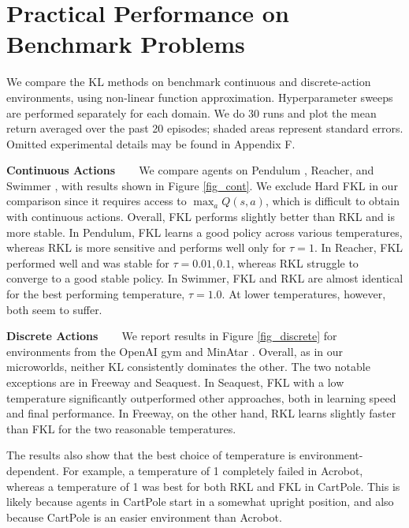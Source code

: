 \documentclass[twoside,11pt]{article}
\newcommand{\myparagraph}[1]{\textbf{#1} \ \ \ }
\begin{document}
\section{Practical Performance on Benchmark Problems}
We compare the KL methods on benchmark continuous and discrete-action environments, using non-linear function approximation. Hyperparameter sweeps are performed separately for each domain. We do 30 runs and plot the mean return averaged over the past 20 episodes; shaded areas represent standard errors. Omitted experimental details may be found in Appendix F. 

\myparagraph{Continuous Actions}
We compare agents on Pendulum \citep{brockman2016openai}, Reacher, and Swimmer \citep{todorov2012mujoco}, with results shown in Figure \ref{fig_cont}. We exclude Hard FKL in our comparison since it requires access to $\max_a Q(s,a)$, which is difficult to obtain with continuous actions. Overall, FKL performs slightly better than RKL and is more stable.
In Pendulum, FKL learns a good policy across various temperatures, whereas RKL is more sensitive and performs well only for $\tau = 1$. 
In Reacher, FKL performed well and was stable for $\tau=0.01, 0.1$, whereas RKL struggle to converge to a good stable policy. 
In Swimmer, FKL and RKL are almost identical for the best performing temperature, $\tau=1.0$. At lower temperatures, however, both seem to suffer.

\myparagraph{Discrete Actions}
We report results in Figure \ref{fig_discrete} for environments from the OpenAI gym \citep{brockman2016openai} and MinAtar \citep{young2019minatar}. Overall, as in our microworlds, neither KL consistently dominates the other. The two notable exceptions are in Freeway and Seaquest. In Seaquest, FKL with a low temperature significantly outperformed other approaches, both in learning speed and final performance. In Freeway, on the other hand, RKL learns slightly faster than FKL for the two reasonable temperatures.  

The results also show that the best choice of temperature is environment-dependent. For example, a temperature of 1 completely failed in Acrobot, whereas a temperature of 1 was best for both RKL and FKL in CartPole. This is likely because agents in CartPole start in a somewhat upright position, and also because CartPole is an easier environment than Acrobot. 
\end{document}
